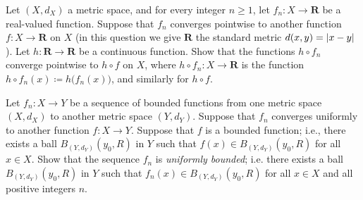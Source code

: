 \begin{exercise}\label{ex 3.2.3}
    Let \((X, d_X)\) a metric space, and for every integer \(n \geq 1\), let \(f_n : X \to \mathbf{R}\) be a real-valued function.
    Suppose that \(f_n\) converges pointwise to another function \(f : X \to \mathbf{R}\) on \(X\)
    (in this question we give \(\mathbf{R}\) the standard metric \(d(x, y) = \abs*{x - y}\)).
    Let \(h : \mathbf{R} \to \mathbf{R}\) be a continuous function.
    Show that the functions \(h \circ f_n\) converge pointwise to \(h \circ f\) on \(X\), where \(h \circ f_n : X \to \mathbf{R}\) is the function \(h \circ f_n(x) \coloneqq h\big(f_n(x)\big)\), and similarly for \(h \circ f\).
\end{exercise}

\begin{exercise}\label{ex 3.2.4}
    Let \(f_n : X \to Y\) be a sequence of bounded functions from one metric space \((X, d_X)\) to another metric space \((Y, d_Y)\).
    Suppose that \(f_n\) converges uniformly to another function \(f : X \to Y\).
    Suppose that \(f\) is a bounded function;
    i.e., there exists a ball \(B_{(Y, d_Y)}(y_0, R)\) in \(Y\) such that \(f(x) \in B_{(Y, d_Y)}(y_0, R)\) for all \(x \in X\).
    Show that the sequence \(f_n\) is \emph{uniformly bounded};
    i.e. there exists a ball \(B_{(Y, d_Y)}(y_0, R)\) in \(Y\) such that \(f_n(x) \in B_{(Y, d_Y)}(y_0, R)\) for all \(x \in X\) and all positive integers \(n\).
\end{exercise}